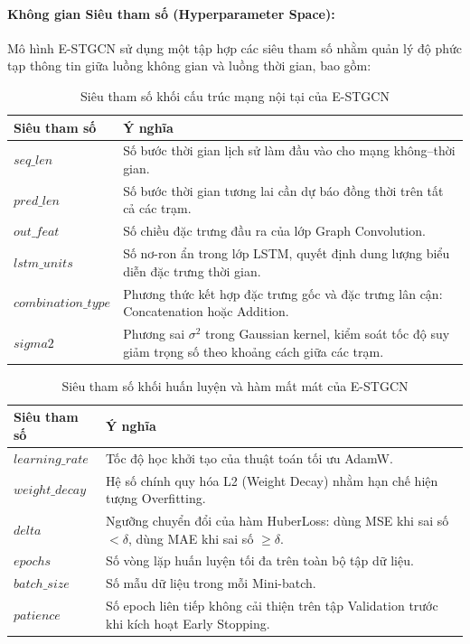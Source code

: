 \paragraph{Không gian Siêu tham số (Hyperparameter Space):}
Mô hình E-STGCN sử dụng một tập hợp các siêu tham số nhằm quản lý độ phức tạp thông tin giữa luồng không gian và luồng thời gian, bao gồm:

\begin{table}[H]
\centering
\caption{Siêu tham số khối cấu trúc mạng nội tại của E-STGCN}
\label{tab:estgcn_structure}
\renewcommand{\arraystretch}{1.3}
\begin{tabular}{p{4cm} p{10.3cm}}
\toprule
\textbf{Siêu tham số} & \textbf{Ý nghĩa} \\
\midrule
$seq\_len$ & Số bước thời gian lịch sử làm đầu vào cho mạng không--thời gian. \\
$pred\_len$ & Số bước thời gian tương lai cần dự báo đồng thời trên tất cả các trạm. \\
$out\_feat$ & Số chiều đặc trưng đầu ra của lớp Graph Convolution. \\
$lstm\_units$ & Số nơ-ron ẩn trong lớp LSTM, quyết định dung lượng biểu diễn đặc trưng thời gian. \\
$combination\_type$ & Phương thức kết hợp đặc trưng gốc và đặc trưng lân cận: Concatenation hoặc Addition. \\
$sigma2$ & Phương sai $\sigma^2$ trong Gaussian kernel, kiểm soát tốc độ suy giảm trọng số theo khoảng cách giữa các trạm. \\
\bottomrule
\end{tabular}
\end{table}

\begin{table}[H]
\centering
\caption{Siêu tham số khối huấn luyện và hàm mất mát của E-STGCN}
\label{tab:estgcn_optim}
\renewcommand{\arraystretch}{1.3}
\begin{tabular}{p{4cm} p{10.3cm}}
\toprule
\textbf{Siêu tham số} & \textbf{Ý nghĩa} \\
\midrule
$learning\_rate$ & Tốc độ học khởi tạo của thuật toán tối ưu AdamW. \\
$weight\_decay$ & Hệ số chính quy hóa L2 (Weight Decay) nhằm hạn chế hiện tượng Overfitting. \\
$delta$ & Ngưỡng chuyển đổi của hàm HuberLoss: dùng MSE khi sai số $< \delta$, dùng MAE khi sai số $\geq \delta$. \\
$epochs$ & Số vòng lặp huấn luyện tối đa trên toàn bộ tập dữ liệu. \\
$batch\_size$ & Số mẫu dữ liệu trong mỗi Mini-batch. \\
$patience$ & Số epoch liên tiếp không cải thiện trên tập Validation trước khi kích hoạt Early Stopping. \\
\bottomrule
\end{tabular}
\end{table}



